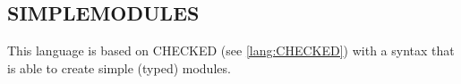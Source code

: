 \documentclass[../codeprint.tex]{subfiles}
\begin{document}
\subsection{SIMPLEMODULES}
This language is  based on CHECKED (see \autoref{lang:CHECKED}) with a syntax that is able to create simple (typed) modules.



\end{document}
